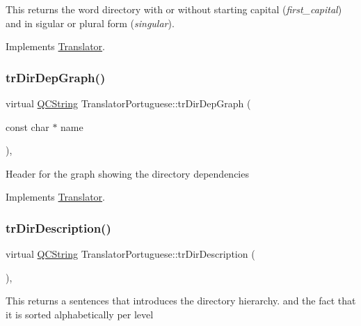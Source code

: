 This returns the word directory with or without starting capital ({\itshape first\+\_\+capital}) and in sigular or plural form ({\itshape singular}). 

Implements \mbox{\hyperlink{class_translator}{Translator}}.

\mbox{\label{class_translator_portuguese_aaa57e73413c0ebb8adaeb20c47b7d70d}} 
\subsubsection{\texorpdfstring{trDirDepGraph()}{trDirDepGraph()}}
{\footnotesize\ttfamily virtual \mbox{\hyperlink{class_q_c_string}{Q\+C\+String}} Translator\+Portuguese\+::tr\+Dir\+Dep\+Graph (\begin{DoxyParamCaption}\item[{const char $\ast$}]{name }\end{DoxyParamCaption})\hspace{0.3cm}{\ttfamily [inline]}, {\ttfamily [virtual]}}

Header for the graph showing the directory dependencies 

Implements \mbox{\hyperlink{class_translator}{Translator}}.

\mbox{\label{class_translator_portuguese_af97437d85cb2e8af12c2aaf8157393cd}} 
\subsubsection{\texorpdfstring{trDirDescription()}{trDirDescription()}}
{\footnotesize\ttfamily virtual \mbox{\hyperlink{class_q_c_string}{Q\+C\+String}} Translator\+Portuguese\+::tr\+Dir\+Description (\begin{DoxyParamCaption}{ }\end{DoxyParamCaption})\hspace{0.3cm}{\ttfamily [inline]}, {\ttfamily [virtual]}}

This returns a sentences that introduces the directory hierarchy. and the fact that it is sorted alphabetically per level 

